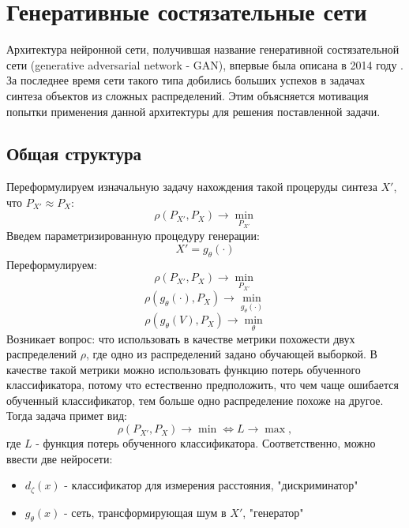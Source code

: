 \section{Генеративные состязательные сети}
	Архитектура нейронной сети, получившая название генеративной состязательной сети (generative adversarial network - GAN), впервые была описана в 2014 году \cite{GAN-original}. За последнее время сети такого типа добились больших успехов в задачах синтеза объектов из сложных распределений. Этим объясняется мотивация попытки применения данной архитектуры для решения поставленной задачи.
	\subsection{Общая структура}
		Переформулируем изначальную задачу нахождения такой процеруды синтеза $X'$, что $ P_{X'} \approx P_X$:
		$$ \rho(P_{X'}, P_X) \longrightarrow \underset{P_{X'}}{\min} $$
		Введем параметризированную процедуру генерации:
		$$ X' = g_{\theta}(\cdot) $$
		Переформулируем:
		$$ \rho(P_{X'}, P_X) \longrightarrow \underset{P_{X'}}{\min} $$
		$$ \rho(g_{\theta}(\cdot), P_X) \longrightarrow \underset{g_{\theta}(\cdot)}{\min} $$
		$$ \rho(g_{\theta}(V), P_X) \longrightarrow \underset{\theta}{\min} $$
		Возникает вопрос: что использовать в качестве метрики похожести двух распределений $\rho$, где одно из распределений задано обучающей выборкой.
		В качестве такой метрики можно использовать функцию потерь обученного классификатора, потому что естественно предположить, что чем чаще ошибается обученный классификатор, тем больше одно распределение похоже на другое. Тогда задача примет вид:
		$$ \rho(P_{X'}, P_X) \longrightarrow \min \Leftrightarrow L \longrightarrow \max, $$
		где $L$ - функция потерь обученного классификатора.
		Соответственно, можно ввести две нейросети:
		
		\begin{itemize}
			\item $d_{\zeta}(x)$ - классификатор для измерения расстояния, "дискриминатор"
			\item $g_{\theta}(x)$ - сеть, трансформирующая шум в $X'$, "генератор"
		\end{itemize}
		
